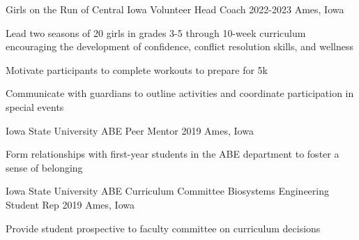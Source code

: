

\begin{cventries}

  \cventry
    {Girls on the Run of Central Iowa} %
    {Volunteer Head Coach} %
    {2022-2023} %
    {Ames, Iowa} %
    {
      \begin{cvitems} %
      \setlength\itemsep{.4em}
        \item {Lead two seasons of 20 girls in grades 3-5 through 10-week curriculum encouraging the development of confidence, conflict resolution skills, and wellness}
        \item {Motivate participants to complete workouts to prepare for 5k}
        \item {Communicate with guardians to outline activities and coordinate participation in special events}
      \end{cvitems}
    }
  \vspace*{.5cm}  
  \cventry
    {Iowa State University} %
    {ABE Peer Mentor} %
    {2019} %
    {Ames, Iowa} %
    {
      \begin{cvitems} %
      \setlength\itemsep{.4em}
        \item {Form relationships with first-year students in the ABE department to foster a sense of belonging}
      \end{cvitems}
    }
\vspace*{.5cm}
    \cventry
    {Iowa State University} %
    {ABE Curriculum Committee Biosystems Engineering Student Rep} %
    {2019} %
    {Ames, Iowa} %
    {
      \begin{cvitems} %
      \setlength\itemsep{.4em}
        \item {Provide student prospective to faculty committee on curriculum decisions}
      \end{cvitems}
    }
\end{cventries}